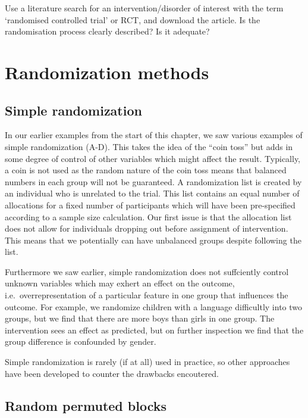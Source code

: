 \documentclass[]{book}
\begin{document}
Use a literature search for an intervention/disorder of interest with the term `randomised controlled trial' or RCT, and download the article.
Is the randomisation process clearly described? Is it adequate?

\hypertarget{randomization-methods}{%
\section{Randomization methods}\label{randomization-methods}}

\hypertarget{simple-randomization}{%
\subsection{Simple randomization}\label{simple-randomization}}

In our earlier examples from the start of this chapter, we saw various examples of simple randomization (A-D). This takes the idea of the ``coin toss'' but adds in some degree of control of other variables which might affect the result. Typically, a coin is not used as the random nature of the coin toss means that balanced numbers in each group will not be guaranteed. A randomization list is created by an individual who is unrelated to the trial. This list contains an equal number of allocations for a fixed number of participants which will have been pre-specified according to a sample size calculation. Our first issue is that the allocation list does not allow for individuals dropping out before assignment of intervention. This means that we potentially can have unbalanced groups despite following the list.

Furthermore we saw earlier, simple randomization does not suffciently control unknown variables which may exhert an effect on the outcome, i.e.~overrepresentation of a particular feature in one group that influences the outcome. For example, we randomize children with a language difficultly into two groups, but we find that there are more boys than girls in one group. The intervention sees an effect as predicted, but on further inspection we find that the group difference is confounded by gender.

Simple randomization is rarely (if at all) used in practice, so other approaches have been developed to counter the drawbacks encoutered.

\hypertarget{random-permuted-blocks}{%
\subsection{Random permuted blocks}\label{random-permuted-blocks}}
\end{document}
